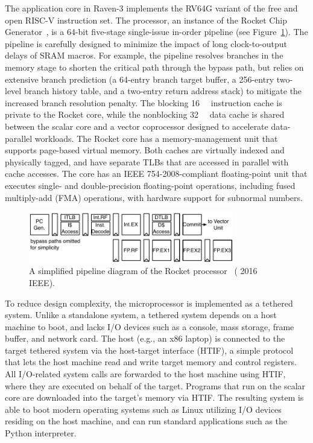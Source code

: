 \documentclass[graybox]{svmult}
\begin{document}
The application core in Raven-3 implements the RV64G variant of the free and open RISC-V instruction set.
The processor, an instance of the Rocket Chip Generator~\cite{Rocket2016}, is a 64-bit five-stage single-issue in-order pipeline (see Figure~\ref{fig:6-raven3-rocket}).
The pipeline is carefully designed to minimize the impact of long clock-to-output delays of SRAM macros.
For example, the pipeline resolves branches in the memory stage to shorten the critical path through the bypass path, but relies on extensive branch prediction (a 64-entry branch target buffer, a 256-entry two-level branch history table, and a two-entry return address stack) to mitigate the increased branch resolution penalty.
The blocking \SI{16}{\kibi\byte} instruction cache is private to the Rocket core, while the nonblocking \SI{32}{\kibi\byte} data cache is shared between the scalar core and a vector coprocessor designed to accelerate data-parallel workloads.
The Rocket core has a memory-management unit that supports page-based virtual memory.
Both caches are virtually indexed and physically tagged, and have separate TLBs that are accessed in parallel with cache accesses.
The core has an IEEE 754-2008-compliant floating-point unit that executes single- and double-precision floating-point operations, including fused multiply-add (FMA) operations, with hardware support for subnormal numbers.

\begin{figure}
  \centering
  \includegraphics[width=0.8\textwidth]{6-raven3-rocket}
  \caption{A simplified pipeline diagram of the Rocket processor~\cite{Zimmer2016} ({\textcopyright} 2016 IEEE).}
  \label{fig:6-raven3-rocket}
\end{figure}

To reduce design complexity, the microprocessor is implemented as a tethered system.
Unlike a standalone system, a tethered system depends on a host machine to boot, and lacks I/O devices such as a console, mass storage, frame buffer, and network card.
The host (e.g., an x86 laptop) is connected to the target tethered system via the host-target interface (HTIF), a simple protocol that lets the host machine read and write target memory and control registers.
All I/O-related system calls are forwarded to the host machine using HTIF, where they are executed on behalf of the target.
Programs that run on the scalar core are downloaded into the target's memory via HTIF.
The resulting system is able to boot modern operating systems such as Linux utilizing I/O devices residing on the host machine, and can run standard applications such as the Python interpreter.
\end{document}
